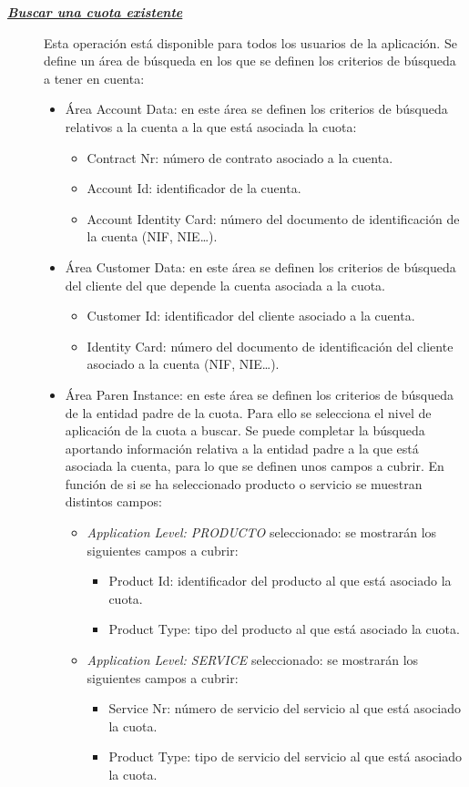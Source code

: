 \begin{description}
\item[\underline{\textsl{\textbf{Buscar una cuota existente}}}] Esta operación está disponible para todos los usuarios de la aplicación.
Se define un área de búsqueda en los que se definen los criterios de búsqueda a tener en cuenta:
\begin{itemize}
	\item Área Account Data: en este área se definen los criterios de búsqueda relativos a la cuenta a la que está asociada la cuota:
		\begin{itemize}
			\item Contract Nr: número de contrato asociado a la cuenta.
			\item Account Id: identificador de la cuenta.
			\item Account Identity Card: número del documento de identificación de la cuenta (NIF, NIE\dots).
		\end{itemize}
	\item Área Customer Data: en este área se definen los criterios de búsqueda del cliente del que depende la cuenta asociada a la cuota.
		\begin{itemize}
			\item Customer Id: identificador del cliente asociado a la cuenta.
			\item Identity Card: número del documento de identificación del cliente asociado a la cuenta (NIF, NIE\dots).
		\end{itemize}
	\item Área Paren Instance: en este área se definen los criterios de búsqueda de la entidad padre de la cuota. Para ello se selecciona el nivel de aplicación de la cuota a buscar. Se puede completar la búsqueda aportando información relativa a la entidad padre a la que está asociada la cuenta, para lo que se definen unos campos a cubrir. En función de si se ha seleccionado producto o servicio se muestran distintos campos:
	\begin{itemize}
 		\item \emph{Application Level: PRODUCTO} seleccionado: se mostrarán los siguientes campos a cubrir:
			\begin{itemize}
				\item Product Id: identificador del producto al que está asociado la cuota.
				\item Product Type: tipo del producto al que está asociado la cuota.
			\end{itemize}
		\item \emph{Application Level: SERVICE} seleccionado:  se mostrarán los siguientes campos a cubrir:
		\begin{itemize}
			\item Service Nr: número de servicio del servicio al que está asociado la cuota.
			\item Product Type: tipo de servicio del servicio al que está asociado la cuota.
		\end{itemize}
		

\end{itemize}
\end{itemize}
\end{description}
